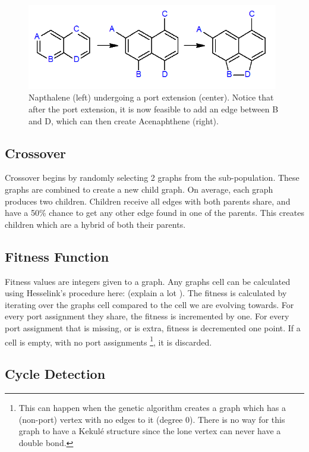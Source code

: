 \documentclass[12pt]{article}
\begin{document}
\begin{figure}[ht!]
\centering
\includegraphics[width=110mm]{portExtension.png}
\caption{Napthalene (left) undergoing a port extension (center). Notice that after the port extension, it is now feasible to add an edge between B and D, which can then create Acenaphthene (right).}
\label{fig:portExtension}
\end{figure}

\subsection{Crossover}

Crossover begins by randomly selecting 2 graphs from the sub-population. These graphs are combined to create a new child graph. On average, each graph produces two children. Children receive all edges with both parents share, and have a 50\% chance to get any other edge found in one of the parents. This creates children which are a hybrid of both their parents.

\subsection{Fitness Function}

Fitness values are integers given to a graph. Any graphs cell can be calculated using Hesselink's procedure here: (explain a lot ). The fitness is calculated by iterating over the graphs cell compared to the cell we are evolving towards. For every port assignment they share, the fitness is incremented by one. For every port assignment that is missing, or is extra, fitness is decremented one point. If a cell is empty, with no port assignments \footnote{This can happen when the genetic algorithm creates a graph which has a (non-port) vertex with no edges to it (degree 0). There is no way for this graph to have a Kekul\'e structure since the lone vertex can never have a double bond.}, it is discarded.

\subsection{Cycle Detection}
\end{document}
